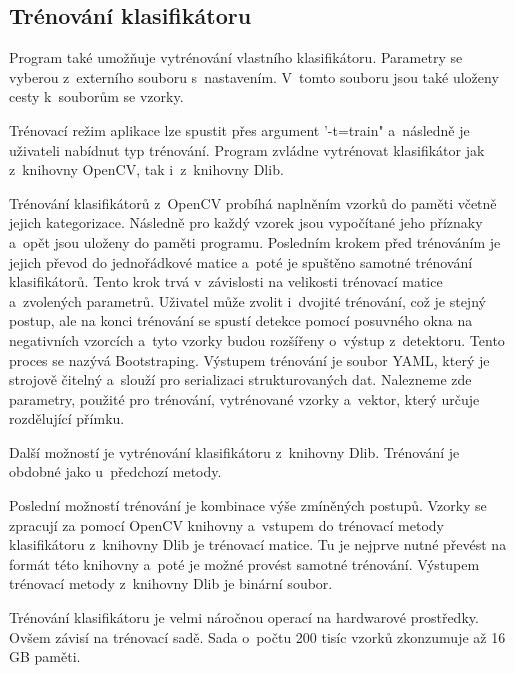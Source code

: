 \subsection{Trénování klasifikátoru}
Program také umožňuje vytrénování vlastního klasifikátoru. Parametry se vyberou z~externího souboru s~nastavením. V~tomto souboru jsou také uloženy cesty k~souborům se vzorky. 

Trénovací režim aplikace lze spustit přes argument '-t=train" a~následně je uživateli nabídnut typ trénování. Program zvládne vytrénovat klasifikátor jak z~knihovny OpenCV, tak i~z~knihovny Dlib. 

Trénování klasifikátorů z~OpenCV probíhá naplněním vzorků do paměti včetně jejich kategorizace. Následně pro každý vzorek jsou vypočítané jeho příznaky a~opět jsou uloženy do paměti programu. Posledním krokem před trénováním je jejich převod do jednořádkové matice a~poté je spuštěno samotné trénování klasifikátorů. Tento krok trvá v~závislosti na velikosti trénovací matice a~zvolených parametrů. Uživatel může zvolit i~dvojité trénování, což je stejný postup, ale na konci trénování se spustí detekce pomocí posuvného okna na negativních vzorcích a~tyto vzorky budou rozšířeny o~výstup z~detektoru. Tento proces se nazývá Bootstraping. Výstupem trénování je soubor YAML, který je strojově čitelný a~slouží pro serializaci strukturovaných dat. Nalezneme zde parametry, použité pro trénování, vytrénované vzorky a~vektor, který určuje rozdělující přímku.

Další možností je vytrénování klasifikátoru z~knihovny Dlib. Trénování je obdobné jako u~předchozí metody. %

Poslední možností trénování je kombinace výše zmíněných postupů. Vzorky se zpracují za pomocí OpenCV knihovny a~vstupem do trénovací metody klasifikátoru z~knihovny Dlib je trénovací matice. Tu je nejprve nutné převést na formát této knihovny a~poté je možné provést samotné trénování.
Výstupem trénovací metody z~knihovny Dlib je binární soubor.

Trénování klasifikátoru je velmi náročnou operací na hardwarové prostředky. Ovšem závisí na trénovací sadě. Sada o~počtu 200 tisíc vzorků zkonzumuje až 16 GB paměti.

